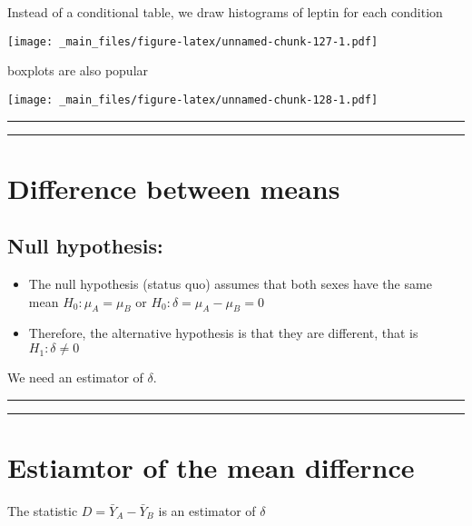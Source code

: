 \documentclass[
]{book}
\begin{document}
Instead of a conditional table, we draw histograms of leptin for each condition

\texttt{[image: \_main\_files/figure-latex/unnamed-chunk-127-1.pdf]}

boxplots are also popular

\texttt{[image: \_main\_files/figure-latex/unnamed-chunk-128-1.pdf]}

\begin{center}\rule{0.5\linewidth}{0.5pt}\end{center}

\begin{center}\rule{0.5\linewidth}{0.5pt}\end{center}

\hypertarget{difference-between-means-4}{%
\section{Difference between means}\label{difference-between-means-4}}

\hypertarget{null-hypothesis-4}{%
\subsection{Null hypothesis:}\label{null-hypothesis-4}}

\begin{itemize}
\item
  The null hypothesis (status quo) assumes that both sexes have the same mean \(H_0: \mu_A=\mu_B\) or \(H_0: \delta=\mu_A-\mu_B=0\)
\item
  Therefore, the alternative hypothesis is that they are different, that is \(H_1: \delta \neq 0\)
\end{itemize}

We need an estimator of \(\delta\).

\begin{center}\rule{0.5\linewidth}{0.5pt}\end{center}

\begin{center}\rule{0.5\linewidth}{0.5pt}\end{center}

\hypertarget{estiamtor-of-the-mean-differnce}{%
\section{Estiamtor of the mean differnce}\label{estiamtor-of-the-mean-differnce}}

The statistic \(D=\bar{Y}_A-\bar{Y}_B\) is an estimator of \(\delta\)
\end{document}
